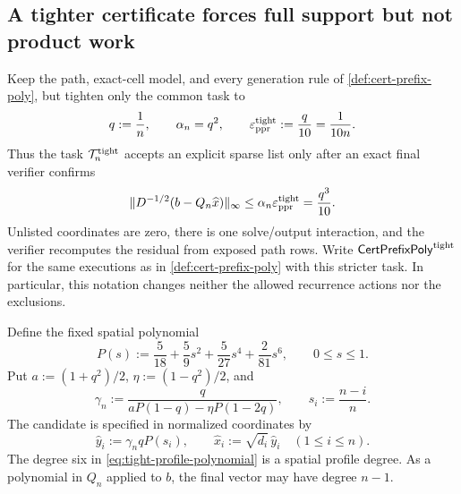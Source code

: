 \subsection{A tighter certificate forces full support but not product work}

Keep the path, exact-cell model, and every generation rule of
\cref{def:cert-prefix-poly}, but tighten only the common task to
\begin{equation}
 q:=\frac1n,
 \qquad
 \alpha_n=q^2,
 \qquad
 \varepsilon_{\mathrm{ppr}}^{\rm tight}:=\frac{q}{10}=\frac1{10n}.
 \label{eq:tight-certificate-path-parameters}
\end{equation}
Thus the task $\mathcal T_n^{\rm tight}$ accepts an explicit sparse list only
after an exact final verifier confirms
\begin{equation}
 \lVert D^{-1/2}(b-Q_n\widehat x)\rVert_\infty
 \leq \alpha_n\varepsilon_{\mathrm{ppr}}^{\rm tight}=\frac{q^3}{10}.
 \label{eq:tight-sparse-path-residual-task}
\end{equation}
Unlisted coordinates are zero, there is one solve/output interaction, and the
verifier recomputes the residual from exposed path rows.  Write
$\mathsf{CertPrefixPoly}^{\rm tight}$ for the same executions as in
\cref{def:cert-prefix-poly} with this stricter task.  In particular, this
notation changes neither the allowed recurrence actions nor the exclusions.

Define the fixed spatial polynomial
\begin{equation}
 P(s):=\frac5{18}+\frac59s^2+\frac5{27}s^4+\frac2{81}s^6,
 \qquad 0\leq s\leq1.
 \label{eq:tight-profile-polynomial}
\end{equation}
Put $a:=(1+q^2)/2$, $\eta:=(1-q^2)/2$, and
\begin{equation}
 \gamma_n:=
 \frac{q}{aP(1-q)-\eta P(1-2q)},
 \qquad
 s_i:=\frac{n-i}{n}.
 \label{eq:tight-profile-normalizer}
\end{equation}
The candidate is specified in normalized coordinates by
\begin{equation}
 \widehat y_i:=\gamma_n qP(s_i),
 \qquad
 \widehat x_i:=\sqrt{d_i}\,\widehat y_i
 \quad(1\leq i\leq n).
 \label{eq:tight-profile-candidate}
\end{equation}
The degree six in \cref{eq:tight-profile-polynomial} is a spatial profile
degree.  As a polynomial in $Q_n$ applied to $b$, the final vector may have
degree $n-1$.

